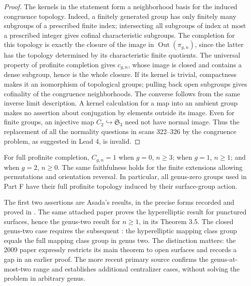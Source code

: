 \begin{proof}
The kernels in the statement form a neighborhood basis for the induced
congruence topology.  Indeed, a finitely generated group has only finitely
many subgroups of a prescribed finite index; intersecting all subgroups
of index at most a prescribed integer gives cofinal characteristic
subgroups.  The completion for this topology is exactly the closure of
the image in $\operatorname{Out}(\pi_{g,n})$, since the latter has the
topology determined by its characteristic finite quotients.  The
universal property of profinite completion gives $c_{g,n}$, whose image
is closed and contains a dense subgroup, hence is the whole closure.
If its kernel is trivial, compactness makes it an isomorphism of
topological groups; pulling back open subgroups gives cofinality of the
congruence neighborhoods.  The converse follows from the same inverse
limit description.  A kernel calculation for a map into an ambient
group makes no assertion about conjugation by elements outside its
image.  Even for finite groups, an injective map $C_2\hookrightarrow
\mathfrak S_3$ need not have normal image.  Thus the replacement of all
the normality questions in scans 322--326 by the congruence problem, as
suggested in Lead 4, is invalid.
\end{proof}

For full profinite completion, $C_{g,n}=1$ when $g=0$, $n\geq3$; when
$g=1$, $n\geq1$; and when $g=2$, $n\geq0$.  The same faithfulness
holds for the finite extensions allowing permutations and orientation
reversal.  In particular, all genus-zero groups used in Part F have
their full profinite topology induced by their surface-group action.

The first two assertions are Asada's results, in the precise forms
recorded and proved in \citet[Proposition 2.6 and Theorem 2.8]{Boggi2009BC}.
The same attached paper proves the hyperelliptic result for punctured
surfaces, hence the genus-two result for $n\geq1$, in its Theorem 3.5.
The closed genus-two case requires the subsequent
\citet[Theorem 1.4(ii), with $\mathscr C=\mathscr F$]{Boggi2020BC}:
the hyperelliptic mapping class group equals the full mapping class
group in genus two.  The distinction matters: the 2009 paper expressly
restricts its main theorem to open surfaces and records a gap in an
earlier proof.  The more recent primary source
\citet[\S1.1 and Corollary B]{Boggi2026BC} confirms the genus-at-most-two
range and establishes additional centralizer cases, without solving
the problem in arbitrary genus.

